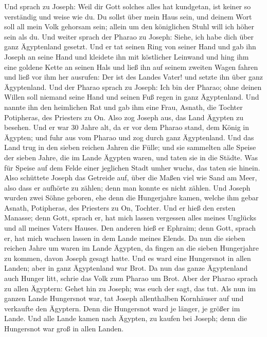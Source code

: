  Und sprach zu Joseph: Weil dir Gott solches alles hat
kundgetan, ist keiner so verständig und weise wie du.  Du
sollst über mein Haus sein, und deinem Wort soll all mein Volk gehorsam
sein; allein um den königlichen Stuhl will ich höher sein als du.
 Und weiter sprach der Pharao zu Joseph: Siehe, ich habe
dich über ganz Ägyptenland gesetzt.  Und er tat seinen
Ring von seiner Hand und gab ihn Joseph an seine Hand und kleidete ihn
mit köstlicher Leinwand und hing ihm eine goldene Kette an seinen Hals
 und ließ ihn auf seinem zweiten Wagen fahren und ließ
vor ihm her ausrufen: Der ist des Landes Vater! und setzte ihn über ganz
Ägyptenland.  Und der Pharao sprach zu Joseph: Ich bin
der Pharao; ohne deinen Willen soll niemand seine Hand und seinen Fuß
regen in ganz Ägyptenland.  Und nannte ihn den heimlichen
Rat und gab ihm eine Frau, Asnath, die Tochter Potipheras, des Priesters
zu On. Also zog Joseph aus, das Land Ägypten zu besehen. 
Und er war 30 Jahre alt, da er vor dem Pharao stand, dem König in
Ägypten; und fuhr aus vom Pharao und zog durch ganz Ägyptenland.
 Und das Land trug in den sieben reichen Jahren die
Fülle;  und sie sammelten alle Speise der sieben Jahre,
die im Lande Ägypten waren, und taten sie in die Städte. Was für Speise
auf dem Felde einer jeglichen Stadt umher wuchs, das taten sie hinein.
 Also schüttete Joseph das Getreide auf, über die Maßen
viel wie Sand am Meer, also dass er aufhörte zu zählen; denn man konnte
es nicht zählen.  Und Joseph wurden zwei Söhne geboren,
ehe denn die Hungerjahre kamen, welche ihm gebar Asnath, Potipheras, des
Priesters zu On, Tochter.  Und er hieß den ersten
Manasse; denn Gott, sprach er, hat mich lassen vergessen alles meines
Unglücks und all meines Vaters Hauses.  Den anderen hieß
er Ephraim; denn Gott, sprach er, hat mich wachsen lassen in dem Lande
meines Elends.  Da nun die sieben reichen Jahre um waren
im Lande Ägypten,  da fingen an die sieben Hungerjahre zu
kommen, davon Joseph gesagt hatte. Und es ward eine Hungersnot in allen
Landen; aber in ganz Ägyptenland war Brot.  Da nun das
ganze Ägyptenland auch Hunger litt, schrie das Volk zum Pharao um Brot.
Aber der Pharao sprach zu allen Ägyptern: Gehet hin zu Joseph; was euch
der sagt, das tut.  Als nun im ganzen Lande Hungersnot
war, tat Joseph allenthalben Kornhäuser auf und verkaufte den Ägyptern.
Denn die Hungersnot ward je länger, je größer im Lande. 
Und alle Lande kamen nach Ägypten, zu kaufen bei Joseph; denn die
Hungersnot war groß in allen Landen.

